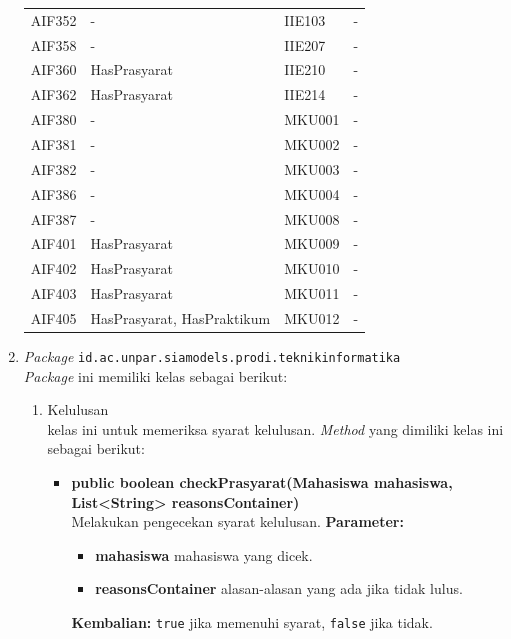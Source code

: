 \begin{enumerate}
\begin{table}[H]
\begin{tabular}{|p{2.125cm}|p{4.9cm}|p{2.125cm}|p{4.9cm}|}
    AIF352  & -                          &  IIE103    & -		     \\
    AIF358  & -                          &	IIE207    & -   			\\
    AIF360  & HasPrasyarat               &  IIE210    & -				\\
    AIF362  & HasPrasyarat               &	IIE214    &	-   			\\
    AIF380  & -                          &	MKU001	  & -     			\\
    AIF381  & -                          &	MKU002	  & -      			\\
    AIF382  & -                          &	MKU003	  & -     			\\
    AIF386  & -                          &	MKU004    & -     			\\
    AIF387  & -                          &	MKU008	  & -    			\\
    AIF401  & HasPrasyarat               &	MKU009    &	-				\\
    AIF402  & HasPrasyarat               &	MKU010	  &	-				\\
    AIF403  & HasPrasyarat               &	MKU011	  & -				\\
    AIF405  & HasPrasyarat, HasPraktikum &	MKU012	  &	-				\\
		\hline
    \end{tabular}
		
	\label{tab:3_kelas_matakuliah}
\end{table}
	\item \textit{Package} \texttt{id.ac.unpar.siamodels.prodi.teknikinformatika}\\
	\textit{Package} ini memiliki kelas sebagai berikut:
	\begin{enumerate}
		\item Kelulusan\\
		kelas ini untuk memeriksa syarat kelulusan. \textit{Method} yang dimiliki kelas ini sebagai berikut:
		\begin{itemize}
			\item \textbf{public boolean checkPrasyarat(Mahasiswa mahasiswa, List<String> reasonsContainer)}\\
			Melakukan pengecekan syarat kelulusan.
			\textbf{Parameter:}
			\begin{itemize}
				\item \textbf{mahasiswa} mahasiswa yang dicek.
				\item \textbf{reasonsContainer} alasan-alasan yang ada jika tidak lulus.
			\end{itemize}
			\textbf{Kembalian:} \texttt{true} jika memenuhi syarat, \texttt{false} jika tidak.
		\end{itemize}
	\end{enumerate}
\end{enumerate}


